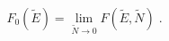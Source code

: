 \begin{equation}
\label{1-2}
F_0(\tilde{E}) = \lim\limits_{\tilde{N}\to 0} F(\tilde{E},\tilde{N})\;.
\end{equation}

